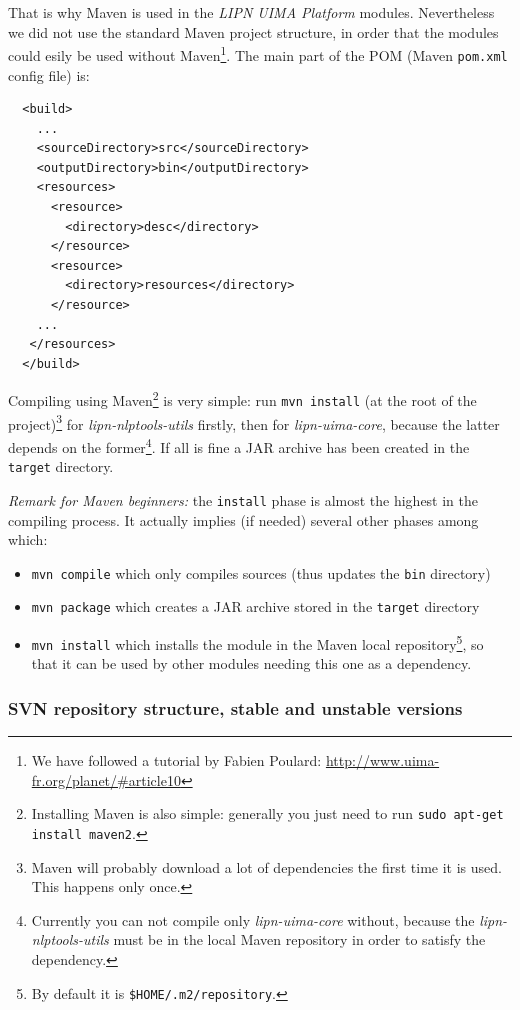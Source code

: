 \documentclass{article}
\newcommand{\softName}{{\em LIPN UIMA Platform}\xspace}
\newenvironment{xitemize}{
\begin{itemize}
  \setlength{\itemsep}{.3\baselineskip}
  \setlength{\topsep}{0pt}
  \setlength{\parskip}{0pt}
  \setlength{\parsep}{0pt}
}{\end{itemize}}
\newcommand{\uimaModule}{{\em lipn-uima-core}\xspace}
\newcommand{\utilsModule}{{\em lipn-nlptools-utils}\xspace}
\begin{document}
That is why Maven is used in the \softName modules. Nevertheless we did not use the standard Maven project structure, in order that the modules could esily be used without Maven\footnote{We have followed a tutorial by Fabien Poulard: \url{http://www.uima-fr.org/planet/\#article10}}. The main part of the POM (Maven {\tt pom.xml} config file) is:

\begin{verbatim}
  <build>
    ...
    <sourceDirectory>src</sourceDirectory>
    <outputDirectory>bin</outputDirectory>
    <resources>
      <resource>
        <directory>desc</directory>
      </resource>
      <resource>
        <directory>resources</directory>
      </resource>
    ...
   </resources>
  </build>
\end{verbatim}

Compiling using Maven\footnote{Installing Maven is also simple: generally you just need to run {\tt sudo apt-get install maven2}.} is very simple: run {\tt mvn install} (at the root of the project)\footnote{Maven will probably download a lot of dependencies the first time it is used. This happens only once.} for \utilsModule firstly, then for \uimaModule, because the latter depends on the former\footnote{Currently you can not compile only \uimaModule without, because the \utilsModule must be in the local Maven repository in order to satisfy the dependency.}. If all is fine a JAR archive has been created in the {\tt target} directory.

{\em Remark for Maven beginners:} the {\tt install} phase is almost the highest in the compiling process. It actually implies (if needed) several other phases among which:
\begin{xitemize}
\item {\tt mvn compile} which only compiles sources (thus updates the {\tt bin} directory)
\item {\tt mvn package} which creates a JAR archive stored in the {\tt target} directory
\item {\tt mvn install} which installs the module in the Maven local repository\footnote{By default it is {\tt \$HOME/.m2/repository}.}, so that it can be used by other modules needing this one as a dependency.
\end{xitemize}

\subsubsection{SVN repository structure, stable and unstable versions}
\end{document}
